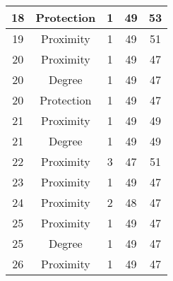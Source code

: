 \documentclass[results.tex]{subfiles}
\begin{document}
\begin{center}
\begin{tabular}{| c || c | c | c | c |}
            \hline
            18                      & Protection                   & 1                      & 49                      & 53                   \\
            \hline
            19                      & Proximity                    & 1                      & 49                      & 51                   \\
            \hline
            20                      & Proximity                    & 1                      & 49                      & 47                   \\
            \hline
            20                      & Degree                       & 1                      & 49                      & 47                   \\
            \hline
            20                      & Protection                   & 1                      & 49                      & 47                   \\
            \hline
            21                      & Proximity                    & 1                      & 49                      & 49                   \\
            \hline
            21                      & Degree                       & 1                      & 49                      & 49                   \\
            \hline
            22                      & Proximity                    & 3                      & 47                      & 51                   \\
            \hline
            23                      & Proximity                    & 1                      & 49                      & 47                   \\
            \hline
            24                      & Proximity                    & 2                      & 48                      & 47                   \\
            \hline
            25                      & Proximity                    & 1                      & 49                      & 47                   \\
            \hline
            25                      & Degree                       & 1                      & 49                      & 47                   \\
            \hline
            26                      & Proximity                    & 1                      & 49                      & 47                   \\

\end{tabular}
\end{center}
\end{document}
